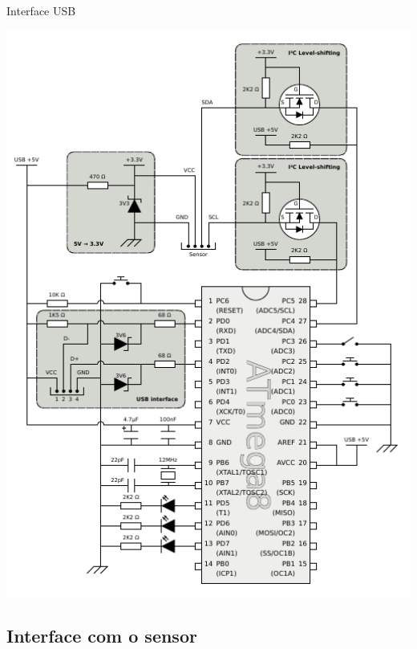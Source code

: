 \documentclass{beamer}
\begin{document}
\begin{frame}{Interface USB}
	\begin{center}
		\includegraphics[keepaspectratio, width=1.0\textwidth, height=0.8\textheight, clip, viewport=0.00in 1.50in 2.00in 2.55in]{../monografia/img/AVR-magnetometer-usb-mouse.pdf}
	\end{center}
\end{frame}


\subsection{Interface com o sensor}

\end{document}
